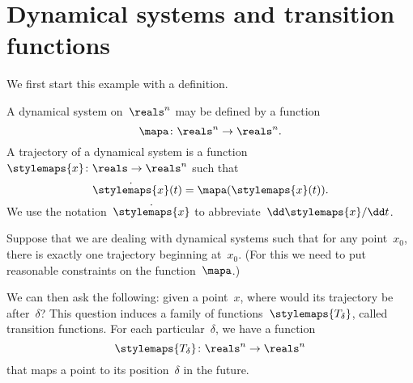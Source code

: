 \section{Dynamical systems and transition functions}

We first start this example with a definition.
\label{exa:transition-functions}
\begin{definition}
    \label{def:ct-dynsyst}
    A dynamical system on~$\reals^n$ may be defined by a function
    \begin{equation}
        \mapa \colon \reals^n \to \reals^n.
    \end{equation}
    A trajectory of a dynamical system is a function~$\stylemaps{x}\colon \reals \to \reals^n$ such that
    \begin{equation}
        \dot{\stylemaps{x}}(t) = \mapa(\stylemaps{x}(t)).
    \end{equation}
    We use the notation~$\dot{\stylemaps{x}}$ to abbreviate~$\dd \stylemaps{x} / \dd t$.
\end{definition}

Suppose that we are dealing with dynamical systems such that for any point~$x_0$, there is exactly one trajectory beginning at~$x_0$.
(For this we need to put reasonable constraints on the function~$\mapa$.)

We can then ask the following: given a point~$x$, where would its trajectory be after~$\delta$?
This question induces a family of functions~$\stylemaps{T_\delta}$, called transition functions.
For each particular~$\delta$, we have a function
\begin{equation*}
    \stylemaps{T_{\delta}}\colon \reals^n \to  \reals^n
\end{equation*}
that maps a point to its position~$\delta$ in the future.

